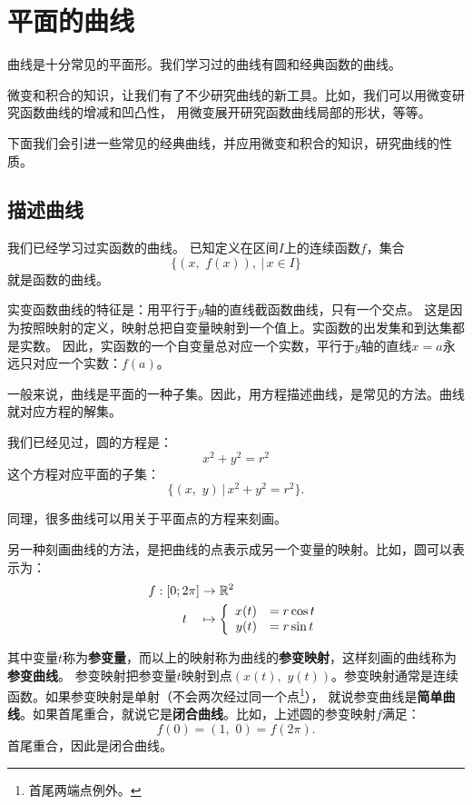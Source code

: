 \documentclass[12pt,UTF8]{ctexbook}
\theoremstyle{definition}
\theoremstyle{plain}
\begin{document}
\chapter{平面的曲线}

曲线是十分常见的平面形。我们学习过的曲线有圆和经典函数的曲线。

微变和积合的知识，让我们有了不少研究曲线的新工具。比如，我们可以用微变研究函数曲线的增减和凹凸性，
用微变展开研究函数曲线局部的形状，等等。

下面我们会引进一些常见的经典曲线，并应用微变和积合的知识，研究曲线的性质。

\section{描述曲线}

我们已经学习过实函数的曲线。
已知定义在区间$I$上的连续函数$f$，集合
$$ \{(x,\,\,f(x)) ,\ | \, x\in I\}$$
就是函数的曲线。

实变函数曲线的特征是：用平行于$y$轴的直线截函数曲线，只有一个交点。
这是因为按照映射的定义，映射总把自变量映射到一个值上。实函数的出发集和到达集都是实数。
因此，实函数的一个自变量总对应一个实数，平行于$y$轴的直线$x = a$永远只对应一个实数：$f(a)$。

一般来说，曲线是平面的一种子集。因此，用方程描述曲线，是常见的方法。曲线就对应方程的解集。

我们已经见过，圆的方程是：
$$ x^2 + y^2 = r^2 $$
这个方程对应平面的子集：
$$ \{(x,\,\,y ) \, | \, x^2 + y^2 = r^2 \}.$$

同理，很多曲线可以用关于平面点的方程来刻画。

另一种刻画曲线的方法，是把曲线的点表示成另一个变量的映射。比如，圆可以表示为：
\begin{align*}
    f: [0;2\pi] &\rightarrow \mathbb{R}^2 \\
    t\quad &\mapsto\left\{
        \begin{array}[]{rl}
            x(t) &= r\cos{t} \\
            y(t) &= r\sin{t} \\
        \end{array}
    \right.
\end{align*}

其中变量$t$称为\textbf{参变量}，而以上的映射称为曲线的\textbf{参变映射}，这样刻画的曲线称为\textbf{参变曲线}。
参变映射把参变量$t$映射到点$(x(t),\,\, y(t))$。参变映射通常是连续函数。如果参变映射是单射（不会两次经过同一个点\footnote{首尾两端点例外。}），
就说参变曲线是\textbf{简单曲线}。如果首尾重合，就说它是\textbf{闭合曲线}。比如，上述圆的参变映射$f$满足：
$$ f(0) =  (1, \,\,0) = f(2\pi). $$
首尾重合，因此是闭合曲线。
\end{document}
